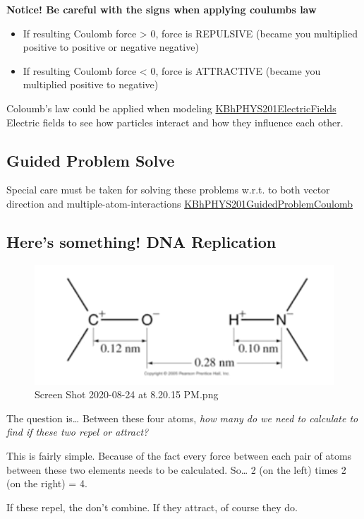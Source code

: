\documentclass[letterpaper]{article}
\begin{document}
\textbf{Notice! Be careful with the signs when applying coulumbs law}

\begin{itemize}
\item If resulting Coulomb force > 0, force is REPULSIVE (became you
multiplied positive to positive or negative negative)
\item If resulting Coulomb force < 0, force is ATTRACTIVE (became you
multiplied positive to negative)
\end{itemize}

Coloumb's law could be applied when modeling
\href{KBhPHYS201ElectricFields.org}{KBhPHYS201ElectricFields} Electric
fields to see how particles interact and how they influence each other.

\subsection{Guided Problem Solve}
\label{sec:orgad9270c}
Special care must be taken for solving these problems w.r.t. to both
vector direction and multiple-atom-interactions
\href{KBhPHYS201GuidedProblemCoulomb.org}{KBhPHYS201GuidedProblemCoulomb}

\subsection{Here's something! DNA Replication}
\label{sec:orgbb19f7a}
\begin{figure}[htbp]
\centering
\includegraphics[width=.9\linewidth]{./Screen Shot 2020-08-24 at 8.20.15 PM.png}
\caption{Screen Shot 2020-08-24 at 8.20.15 PM.png}
\end{figure}

The question is\ldots{} Between these four atoms, \emph{how many do we need to
calculate to find if these two repel or attract?}

This is fairly simple. Because of the fact every force between each pair
of atoms between these two elements needs to be calculated. So\ldots{} 2 (on
the left) times 2 (on the right) = 4.

If these repel, the don't combine. If they attract, of course they do.
\end{document}
